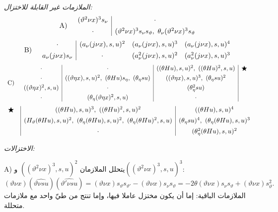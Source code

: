 \documentclass[11pt]{article}
\begin{document}
\noindent\emph{الملازمات غير القابلة للاختزال:}
\[
\begin{array}{r@{\quad}c}
\text{A)}&
\begin{array}{c|c}
(\vartheta^2\nu x)^3s_\nu&\cdot\\[0.45em]
\cdot&(\vartheta^2\nu x)^3s_\nu s_\vartheta,\ \theta_\nu(\vartheta^2\nu x)^3s_\vartheta
\end{array}
\end{array}
\]
\[
\begin{array}{r@{\quad}c}
\text{B)}&
\begin{array}{c|ccc}
\cdot&(a_\nu(j\nu x),s,u)^2&(a_\nu(j\nu x),s,u)^3&(a_\nu(j\nu x),s,u)^4\\[0.45em]
a_\nu(j\nu x)s_\nu&\cdot&(a_\nu^2(j\nu x),s,u)^2&(a_\nu^2(j\nu x),s,u)^3
\end{array}
\end{array}
\]
\[
\begin{array}{r@{\quad}c}
\text{C)}&
\begin{array}{c|c|c|c}
\cdot&\cdot&((\theta Hu),s,u)^2,\ ((\theta Hu)^2,s,u)&\bigstar\\[0.35em]
\cdot&((\vartheta\eta x),s,u)^2,\ (\theta Hu)s_\eta,\ (\theta_\eta su)&((\vartheta\eta x),s,u)^3,\ (\theta_\eta su)^2&\\[0.35em]
((\vartheta\eta x)^2,s,u)&\cdot&(\theta_\eta^2su)&\\[0.35em]
\cdot&(\theta_\eta(\vartheta\eta x)^2,s,u)&\cdot&
\end{array}
\end{array}
\]
\[
\begin{array}{c@{\quad}|c|c}
\bigstar&((\theta Hu),s,u)^3,\ ((\theta Hu)^2,s,u)^2&((\theta Hu),s,u)^4\\[0.45em]
&(H_\vartheta(\theta Hu),s,u)^2,\ (\theta_\eta(\theta Hu),s,u)^2,\ (\theta_\eta(\theta Hu)^2,s,u)&(\theta_\eta su)^4,\ (\theta_\eta(\theta Hu),s,u)^3\\[0.45em]
&\cdot&(\theta_\eta^2(\theta Hu),s,u)^2
\end{array}
\]

\noindent\emph{الاختزالات:}

A) يتحلل الملازمان $((\vartheta^2\nu x)^3,s,u)^2$ و$((\vartheta^2\nu x)^3,s,u)^3$:
\[
(\vartheta \nu x)(\widehat{\vartheta \nu su})(\widehat{\vartheta'\nu su})
=(\vartheta \nu x)s_\vartheta s_{\vartheta'}-(\vartheta \nu x)s_\nu s_\vartheta
=-2\theta(\vartheta \nu x)s_\nu s_\vartheta+(\vartheta \nu x)s_\vartheta^2.
\]
الملازمات الباقية: إما أن يكون مختزل عاملا فيها، وإما تنتج من طيّ واحد مع ملازمات متحللة.
\end{document}
